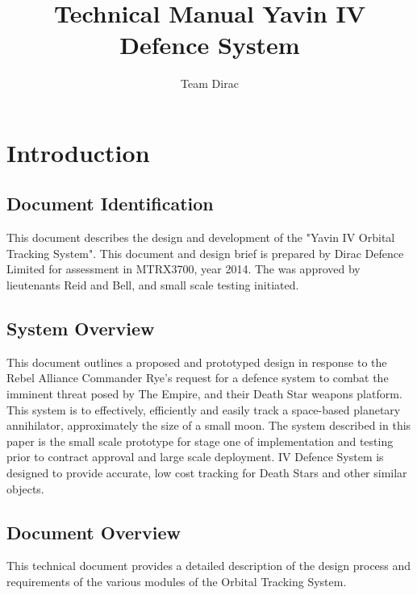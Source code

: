 \documentclass[]{report}
\title{Technical Manual \newline Yavin IV Defence System}
\author{Team Dirac}
\begin{document}
\maketitle

\chapter{Introduction}
\section{Document Identification}

This document describes the design and development of the "Yavin IV Orbital Tracking System".  This document and design brief is prepared by Dirac Defence Limited for assessment in MTRX3700, year 2014. The was approved by lieutenants Reid and Bell, and small scale testing initiated. 

\section{System Overview}

This document outlines a proposed and prototyped design in response to the Rebel Alliance Commander Rye's request for a defence system to combat the imminent threat posed by The Empire, and their Death Star weapons platform. This system is to effectively, efficiently and easily track a space-based planetary annihilator, approximately the size of a small moon.\newline
The system described in this paper is the small scale prototype for stage one of implementation and testing prior to contract approval and large scale deployment. IV Defence System is designed to provide accurate, low cost tracking for Death Stars and other similar objects.

\section{Document Overview}

This technical document provides a detailed description of the design process and requirements of the various modules of the Orbital Tracking System. \newline
\end{document}

